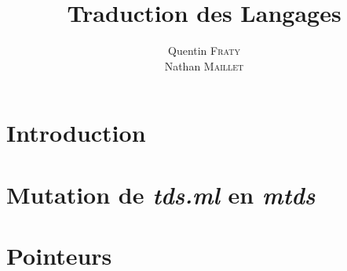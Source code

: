 \documentclass[french]{article}
\begin{document}
\title{\textbf{Traduction des Langages}}
\author{Quentin \textsc{Fraty}\\
        Nathan \textsc{Maillet}}
\date{}

\maketitle


\section{Introduction}

\section{Mutation de \emph{tds.ml} en \emph{mtds}}

\section{Pointeurs}
\end{document}
